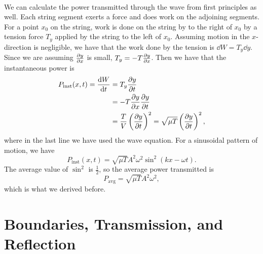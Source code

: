 \documentclass[../classical_mechanics.tex]{subfiles}
\begin{document}
        \paragraph{}
        We can calculate the power transmitted through the wave from first principles as well.
        Each string segment exerts a force and does work on the adjoining segments.
        For a point $x_0$ on the string, work is done on the string by to the right of $x_0$ by a tension force $T_y$ applied by the string to the left of $x_0$.
        Assuming motion in the $x$-direction is negligible, we have that the work done by the tension is $\dd{W}=T_y\dd{y}$.
        Since we are assuming $\pdv{y}{x}$ is small, $T_y=-T\pdv{y}{x}$.
        Then we have that the instantaneous power is
        \begin{align}
            P_\text{inst}(x,t)=\dv{W}{t}&=T_y\pdv{y}{t}\\
            &=-T\pdv{y}{x}\pdv{y}{t}\\
            &=\frac{T}{V}\left(\pdv{y}{t}\right)^2=\sqrt{\mu T}\left(\pdv{y}{t}\right)^2,
        \end{align}
        where in the last line we have used the wave equation.
        For a sinusoidal pattern of motion, we have
        \begin{equation}
            P_\text{inst}(x,t)=\sqrt{\mu T}A^2\omega^2\sin^2(kx-\omega t).
        \end{equation}
        The average value of $\sin^2$ is $\frac{1}{2}$, so the average power transmitted is
        \begin{equation}
            P_\text{avg}=\sqrt{\mu T}A^2\omega^2,
        \end{equation}
        which is what we derived before.

    \section{Boundaries, Transmission, and Reflection}\label{sec:boundaries-transmision-and-reflection}
\end{document}
